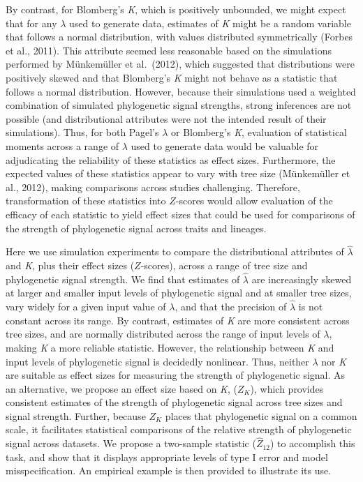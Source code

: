 \documentclass[
]{article}
\begin{document}
By contrast, for Blomberg's \emph{K}, which is positively unbounded, we
might expect that for any \(\lambda\) used to generate data, estimates
of \emph{K} might be a random variable that follows a normal
distribution, with values distributed symmetrically (Forbes et al.,
2011). This attribute seemed less reasonable based on the simulations
performed by Münkemüller et al.~(2012), which suggested that
distributions were positively skewed and that Blomberg's \emph{K} might
not behave as a statistic that follows a normal distribution. However,
because their simulations used a weighted combination of simulated
phylogenetic signal strengths, strong inferences are not possible (and
distributional attributes were not the intended result of their
simulations). Thus, for both Pagel's \(\lambda\) or Blomberg's \emph{K},
evaluation of statistical moments across a range of \(\lambda\) used to
generate data would be valuable for adjudicating the reliability of
these statistics as effect sizes. Furthermore, the expected values of
these statistics appear to vary with tree size (Münkemüller et al.,
2012), making comparisons across studies challenging. Therefore,
transformation of these statistics into \(Z\)-scores would allow
evaluation of the efficacy of each statistic to yield effect sizes that
could be used for comparisons of the strength of phylogenetic signal
across traits and lineages. \hfill\break

Here we use simulation experiments to compare the distributional
attributes of \(\hat{\lambda}\) and \emph{K}, plus their effect sizes
(\(Z\)-scores), across a range of tree size and phylogenetic signal
strength. We find that estimates of \(\hat{\lambda}\) are increasingly
skewed at larger and smaller input levels of phylogenetic signal and at
smaller tree sizes, vary widely for a given input value of \(\lambda\),
and that the precision of \(\hat{\lambda}\) is not constant across its
range. By contrast, estimates of \emph{K} are more consistent across
tree sizes, and are normally distributed across the range of input
levels of \(\lambda\), making \emph{K} a more reliable statistic.
However, the relationship between \emph{K} and input levels of
phylogenetic signal is decidedly nonlinear. Thus, neither \(\lambda\)
nor \emph{K} are suitable as effect sizes for measuring the strength of
phylogenetic signal. As an alternative, we propose an effect size based
on \emph{K}, (\(Z_K\)), which provides consistent estimates of the
strength of phylogenetic signal across tree sizes and signal strength.
Further, because \(Z_K\) places that phylogenetic signal on a common
scale, it facilitates statistical comparisons of the relative strength
of phylogenetic signal across datasets. We propose a two-sample
statistic (\(\hat{Z}_{12}\)) to accomplish this task, and show that it
displays appropriate levels of type I error and model misspecification.
An empirical example is then provided to illustrate its use.
\end{document}
